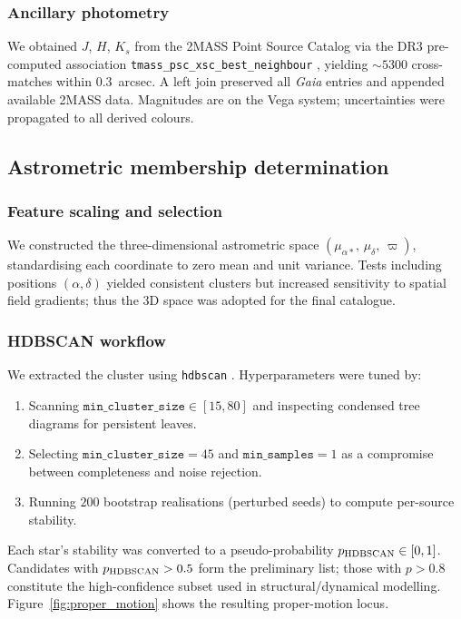 \documentclass[../main.tex]{subfiles}
\begin{document}
\subsubsection{Ancillary photometry}
We obtained $J$, $H$, $K_s$ from the 2MASS Point Source Catalog via the DR3 pre-computed association \texttt{tmass\_psc\_xsc\_best\_neighbour} \citep{2022gdr3.reptE..15M}, yielding $\sim5300$ cross-matches within $0.3$~arcsec. A left join preserved all \textit{Gaia} entries and appended available 2MASS data. Magnitudes are on the Vega system; uncertainties were propagated to all derived colours.

\subsection{Astrometric membership determination}
\label{subsec:membership}

\subsubsection{Feature scaling and selection}
We constructed the three-dimensional astrometric space $(\mu_{\alpha*},\,\mu_\delta,\,\varpi)$, standardising each coordinate to zero mean and unit variance. Tests including positions $(\alpha,\delta)$ yielded consistent clusters but increased sensitivity to spatial field gradients; thus the 3D space was adopted for the final catalogue.

\subsubsection{HDBSCAN workflow}
We extracted the cluster using \texttt{hdbscan} \citep{McInnes2017}. Hyperparameters were tuned by:
\begin{enumerate}
  \item Scanning $\texttt{min\_cluster\_size}\in[15,80]$ and inspecting condensed tree diagrams for persistent leaves.
  \item Selecting $\texttt{min\_cluster\_size}=45$ and $\texttt{min\_samples}=1$ as a compromise between completeness and noise rejection.
  \item Running $200$ bootstrap realisations (perturbed seeds) to compute per-source stability.
\end{enumerate}
Each star’s stability was converted to a pseudo-probability $p_{\rm HDBSCAN}\in[0,1]$. Candidates with $p_{\rm HDBSCAN}>0.5$ form the preliminary list; those with $p>0.8$ constitute the high-confidence subset used in structural/dynamical modelling. Figure~\ref{fig:proper_motion} shows the resulting proper-motion locus.
\end{document}
